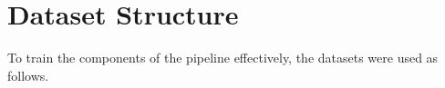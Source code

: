 \section{Dataset Structure}\label{sec:datasetstructure}

To train the components of the pipeline effectively, the datasets were used as follows.


